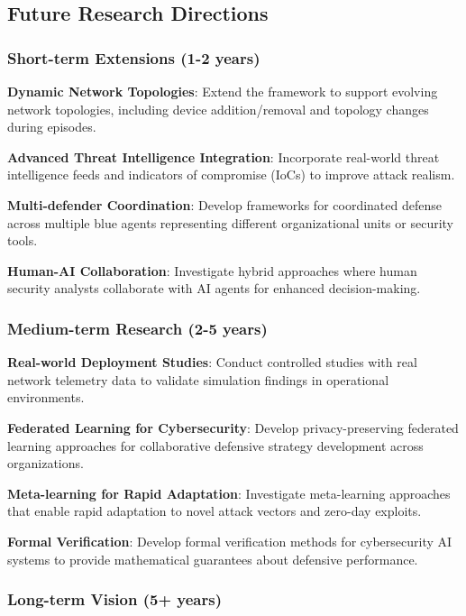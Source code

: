 \documentclass[11pt]{article}
\theoremstyle{definition}
\theoremstyle{plain}
\begin{document}
\subsection{Future Research Directions}

\subsubsection{Short-term Extensions (1-2 years)}

\textbf{Dynamic Network Topologies}: Extend the framework to support evolving network topologies, including device addition/removal and topology changes during episodes.

\textbf{Advanced Threat Intelligence Integration}: Incorporate real-world threat intelligence feeds and indicators of compromise (IoCs) to improve attack realism.

\textbf{Multi-defender Coordination}: Develop frameworks for coordinated defense across multiple blue agents representing different organizational units or security tools.

\textbf{Human-AI Collaboration}: Investigate hybrid approaches where human security analysts collaborate with AI agents for enhanced decision-making.

\subsubsection{Medium-term Research (2-5 years)}

\textbf{Real-world Deployment Studies}: Conduct controlled studies with real network telemetry data to validate simulation findings in operational environments.

\textbf{Federated Learning for Cybersecurity}: Develop privacy-preserving federated learning approaches for collaborative defensive strategy development across organizations.

\textbf{Meta-learning for Rapid Adaptation}: Investigate meta-learning approaches that enable rapid adaptation to novel attack vectors and zero-day exploits.

\textbf{Formal Verification}: Develop formal verification methods for cybersecurity AI systems to provide mathematical guarantees about defensive performance.

\subsubsection{Long-term Vision (5+ years)}
\end{document}
